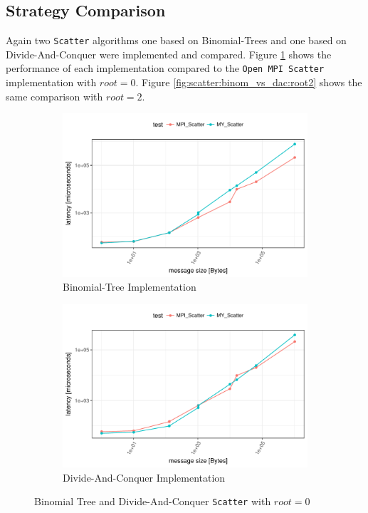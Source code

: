 \subsection{Strategy Comparison}
Again two \texttt{Scatter} algorithms one based on Binomial-Trees and one based on Divide-And-Conquer were implemented and compared. Figure \ref{fig:scatter:binom_vs_dac:root0} shows the performance of each implementation compared to the \texttt{Open MPI Scatter} implementation with $root = 0$. Figure \ref{fig:scatter:binom_vs_dac:root2} shows the same comparison with $root = 2$.

\begin{figure}[H]
  \centering
  \begin{subfigure}[b]{0.49\textwidth}
        \includegraphics[width=\textwidth]{../benchmarks/openmpi/binom/scatter_32/runtime.pdf}
        \caption{Binomial-Tree Implementation}
    \end{subfigure}
    \begin{subfigure}[b]{0.49\textwidth}
        \includegraphics[width=\textwidth]{../benchmarks/openmpi/divide_conquer/scatter_32/runtime.pdf}
        \caption{Divide-And-Conquer Implementation}
    \end{subfigure}
    \caption{Binomial Tree and Divide-And-Conquer \texttt{Scatter} with $root = 0$}
    \label{fig:scatter:binom_vs_dac:root0}
\end{figure}

